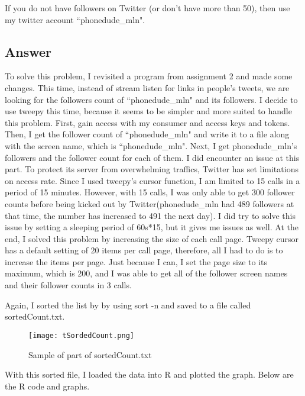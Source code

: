 \documentclass[12pt]{article}
\begin{document}
If you do not have followers on Twitter (or don't have more than 50),
then use my twitter account ``phonedude\_mln".



\subsection*{Answer}

To solve this problem, I revisited a program from assignment 2 and made some changes. This time, instead of stream listen for links in people's tweets, we are looking for the followers count of ``phonedude\_mln" and its followers. I decide to use tweepy this time, because it seems to be simpler and more suited to handle this problem. First, gain access with my consumer and access keys and tokens. Then, I get the follower count of ``phonedude\_mln" and write it to a file along with the screen name, which is ``phonedude\_mln". Next, I get phonedude\_mln's followers and the follower count for each of them. I did encounter an issue at this part. To protect its server from overwhelming traffics, Twitter has set limitations on access rate. Since I used tweepy's cursor function, I am limited to 15 calls in a period of 15 minutes. However, with 15 calls, I was only able to get 300 follower counts before being kicked out by Twitter(phonedude\_mln had 489 followers at that time, the number has increased to 491 the next day). I did try to solve this issue by setting a sleeping period of 60s*15, but it gives me issues as well. At the end, I solved this problem by increasing the size of each call page. Tweepy cursor has a default setting of 20 items per call page, therefore, all I had to do is to increase the items per page. Just because I can, I set the page size to its maximum, which is 200, and I was able to get all of the follower screen names and their follower counts in 3 calls. 



\noindent
Again, I sorted the list by by using sort -n and saved to a file called sortedCount.txt.
\pagebreak

\begin{figure}[h]
\centering
\texttt{[image: tSordedCount.png]}
\caption{Sample of part of sortedCount.txt}
\end{figure}

\noindent
With this sorted file, I loaded the data into R and plotted the graph. Below are the R code and graphs. 
\end{document}
